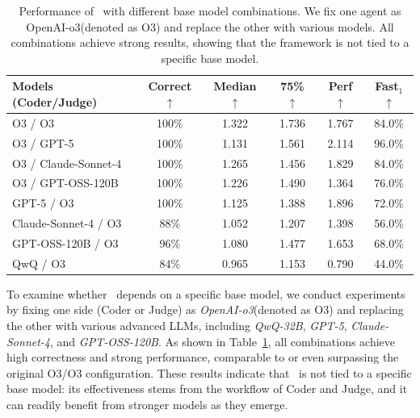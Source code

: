 \begin{table}[t]
\caption{Performance of \agentname~with different base model combinations. We fix one agent as OpenAI-o3(denoted as O3) and replace the other with various models. All combinations achieve strong results, showing that the framework is not tied to a specific base model.} 
\label{tab:base_models}
\centering
\begin{tabular}{lccccc}
\toprule
\textbf{Models (Coder/Judge)} & \textbf{Correct$\uparrow$} & \textbf{Median $\uparrow$}  & \textbf{75\% $\uparrow$}  & \textbf{Perf $\uparrow$}  & \textbf{Fast$_1$$\uparrow$} \\
\midrule
O3 / O3            & 100\% &  1.322 & 1.736 & 1.767 & 84.0\% \\
\midrule
O3 / GPT-5          & 100\% & 1.131 & 1.561 & 2.114 & 96.0\% \\
O3 / Claude-Sonnet-4         & 100\% & 1.265 & 1.456 & 1.829 & 84.0\% \\
O3 / GPT-OSS-120B    & 100\% & 1.226 & 1.490 & 1.364 & 76.0\% \\
\midrule
GPT-5 / O3           & 100\% & 1.125 & 1.388 & 1.896 & 72.0\% \\
Claude-Sonnet-4 / O3          & 88\% & 1.052 & 1.207 & 1.398 & 56.0\% \\
GPT-OSS-120B / O3    & 96\% & 1.080 & 1.477 & 1.653 & 68.0\% \\
QwQ / O3   & 84\% & 0.965 & 1.153  & 0.790 & 44.0\% \\
\bottomrule
\end{tabular}
\end{table}
To examine whether \agentname~depends on a specific base model, we conduct experiments by fixing one side (Coder or Judge) as \textit{OpenAI-o3}(denoted as O3) and replacing the other with various advanced LLMs, including \textit{QwQ-32B}, \textit{GPT-5}, \textit{Claude-Sonnet-4}, and \textit{GPT-OSS-120B}.  
As shown in Table~\ref{tab:base_models}, all combinations achieve high correctness and strong performance, comparable to or even surpassing the original O3/O3 configuration.  
These results indicate that \agentname~is not tied to a specific base model: its effectiveness stems from the workflow of Coder and Judge, and it can readily benefit from stronger models as they emerge.
